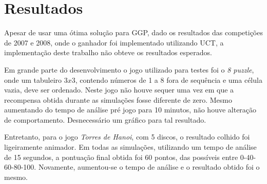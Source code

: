 \chapter{Resultados}
Apesar de usar uma ótima solução para GGP, dado os resultados das competições de 2007 e 2008, onde o ganhador foi implementado utilizando UCT, a implementação deste trabalho não obteve os resultados esperados. 

Em grande parte do desenvolvimento o jogo utilizado para testes foi o \textit{8 puzzle}, onde um tabuleiro $3x3$, contendo números de 1 a 8 fora de sequência e uma célula vazia, deve ser ordenado. Neste jogo não houve sequer uma vez em que a recompensa obtida durante as simulações fosse diferente de zero. Mesmo aumentando do tempo de análise pré jogo para 10 minutos, não houve alteração de comportamento. Desnecessário um gráfico para tal resultado.

Entretanto, para o jogo \textit{Torres de Hanoi}, com 5 discos, o resultado colhido foi ligeiramente animador. Em todas as simulações, utilizando um tempo de análise de 15 segundos, a pontuação final obtida foi 60 pontos, das possíveis entre 0-40-60-80-100.  Novamente, aumentou-se o tempo de análise e o resultado obtido foi o mesmo.